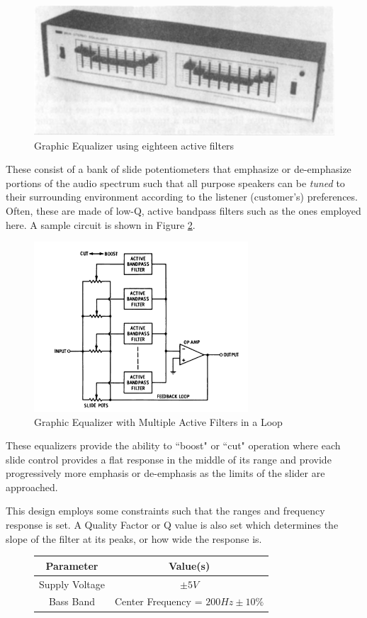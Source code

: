 \documentclass[12pt]{article}
\begin{document}
\begin{figure}[H]
	\centering
	\includegraphics[width=\textwidth]{equalizer}
	\caption{Graphic Equalizer using eighteen active filters}
	\label{fig:equalizer}
\end{figure}
These consist of a bank of slide potentiometers that emphasize or de-emphasize portions of the audio spectrum such that all purpose speakers can be \textit{tuned} to their surrounding environment according to the listener (customer's) preferences. Often, these are made of low-Q, active bandpass filters such as the ones employed here. A sample circuit is shown in Figure \ref{fig:equalizercircuit}.
\begin{figure}[H]
	\centering
	\includegraphics[width=8cm]{equalizercircuit}
	\caption{Graphic Equalizer with Multiple Active Filters in a Loop}
	\label{fig:equalizercircuit}
\end{figure}
These equalizers provide the  ability to ``boost" or ``cut" operation where each slide control provides a flat response in the middle of its range and provide progressively more emphasis or de-emphasis as the limits of the slider are approached.

This design employs some constraints such that the ranges and frequency response is set. A Quality Factor or Q value is also set which determines the slope of the filter at its peaks, or how wide the response is.
\begin{figure}
	\centering
	\begin{tabular}{|c|c|}
		\hline
		Parameter & Value(s) \\
		\hline
		Supply Voltage & $\pm 5V$\\
		\hline
		Bass Band & Center Frequency = $200 Hz \pm 10\%$

	\end{tabular}
\end{figure}
\end{document}
